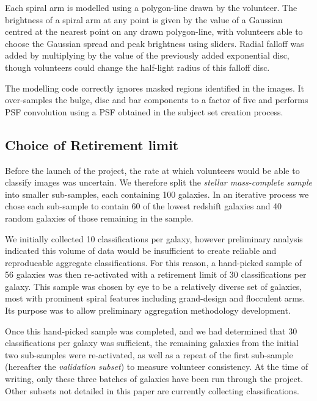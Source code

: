 \documentclass[../main.tex]{subfiles}
\begin{document}
Each spiral arm is modelled using a polygon-line drawn by the volunteer. The brightness of a spiral arm at any point is given by the value of a Gaussian centred at the nearest point on any drawn polygon-line, with volunteers able to choose the Gaussian spread and peak brightness using sliders. Radial falloff was added by multiplying by the value of the previously added exponential disc, though volunteers could change the half-light radius of this falloff disc.

The modelling code correctly ignores masked regions identified in the images. It over-samples the bulge, disc and bar components to a factor of five and performs PSF convolution using a PSF obtained in the subject set creation process.

\subsection{Choice of Retirement limit}
\label{sec:retirement-limit}

Before the launch of the project, the rate at which volunteers would be able to classify images was uncertain. We therefore split the \textit{stellar mass-complete sample} into smaller sub-samples, each containing 100 galaxies. In an iterative process we chose each sub-sample to contain 60 of the lowest redshift galaxies and 40 random galaxies of those remaining in the sample.

We initially collected 10 classifications per galaxy, however preliminary analysis indicated this volume of data would be insufficient to create reliable and reproducable aggregate classifications. For this reason, a hand-picked sample of 56 galaxies was then re-activated with a retirement limit of 30 classifications per galaxy. This sample was chosen by eye to be a relatively diverse set of galaxies, most with prominent spiral features including grand-design and flocculent arms. Its purpose was to allow preliminary aggregation methodology development.

Once this hand-picked sample was completed, and we had determined that 30 classifications per galaxy was sufficient, the remaining galaxies from the initial two sub-samples were re-activated, as well as a repeat of the first sub-sample (hereafter the \textit{validation subset}) to measure volunteer consistency. At the time of writing, only these three batches of galaxies have been run through the project. Other subsets not detailed in this paper are currently collecting classifications.
\end{document}
